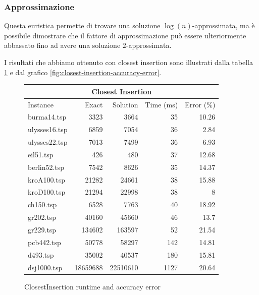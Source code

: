 \subsubsection{Approssimazione}

Questa euristica permette di trovare una soluzione $\log(n)$-approssimata,
ma è possibile dimostrare che il fattore di approssimazione può essere
ulteriormente abbassato fino ad avere una soluzione $2$-approssimata.

I risultati che abbiamo ottenuto con closest insertion sono illustrati
dalla tabella \ref{table:closest-insertion-runtime-accuracy} e dal grafico
\ref{fig:closest-insertion-accuracy-error}.

\begin{figure}[H]
    \centering

    \begin{tabular}{lrrrr}
    \toprule
    \multicolumn{5}{c}{Closest Insertion} \\
    \hline
    Instance & Exact & Solution &   Time (ms) &   Error (\%) \\
    \hline
    burma14.tsp   &     3323 &       3664 &          35 &       10.26 \\
    ulysses16.tsp &     6859 &       7054 &          36 &        2.84 \\
    ulysses22.tsp &     7013 &       7499 &          36 &        6.93 \\
    eil51.tsp     &      426 &        480 &          37 &       12.68 \\
    berlin52.tsp  &     7542 &       8626 &          35 &       14.37 \\
    kroA100.tsp   &    21282 &      24661 &          38 &       15.88 \\
    kroD100.tsp   &    21294 &      22998 &          38 &        8    \\
    ch150.tsp     &     6528 &       7763 &          40 &       18.92 \\
    gr202.tsp     &    40160 &      45660 &          46 &       13.7  \\
    gr229.tsp     &   134602 &     163597 &          52 &       21.54 \\
    pcb442.tsp    &    50778 &      58297 &         142 &       14.81 \\
    d493.tsp      &    35002 &      40537 &         180 &       15.81 \\
    dsj1000.tsp   & 18659688 &   22510610 &        1127 &       20.64 \\
    \bottomrule
    \end{tabular}

    \caption{ClosestInsertion runtime and accuracy error}
    \label{table:closest-insertion-runtime-accuracy}
\end{figure}

